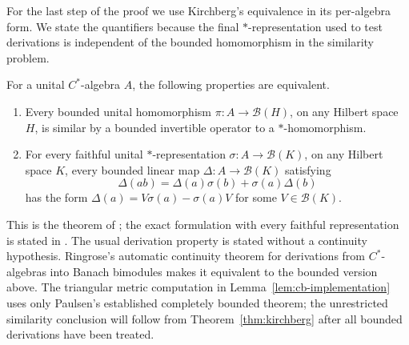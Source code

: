For the last step of the proof we use Kirchberg's equivalence in its
per-algebra form. We state the quantifiers because the final
\(*\)-representation used to test derivations is independent of the
bounded homomorphism in the similarity problem.

\begin{theorem}
\label{thm:kirchberg}
For a unital \(C^*\)-algebra \(A\), the following properties are
equivalent.
\begin{enumerate}
 \item Every bounded unital homomorphism
 \(\pi:A\to\mathcal B(H)\), on any Hilbert space \(H\), is similar
 by a bounded invertible operator to a \(*\)-homomorphism.
 \item For every faithful unital \(*\)-representation
 \(\sigma:A\to\mathcal B(K)\), on any Hilbert space \(K\), every
 bounded linear map \(\Delta:A\to\mathcal B(K)\) satisfying
 \[
  \Delta(ab)=\Delta(a)\sigma(b)+\sigma(a)\Delta(b)
 \]
 has the form \(\Delta(a)=V\sigma(a)-\sigma(a)V\) for some
 \(V\in\mathcal B(K)\).
\end{enumerate}
\end{theorem}

This is the theorem of \citet{Kirchberg1996}; the exact formulation
with every faithful representation is stated in
\citet[Theorem~1.1]{Ozawa2006}. The usual derivation property is stated
without a continuity hypothesis. Ringrose's automatic continuity
theorem for derivations from \(C^*\)-algebras into Banach bimodules
\citep[Theorem~2, p.~434]{Ringrose1972} makes it equivalent to the
bounded version above.
The triangular metric computation in
Lemma~\ref{lem:cb-implementation} uses only Paulsen's established
completely bounded theorem; the unrestricted similarity conclusion
will follow from Theorem~\ref{thm:kirchberg} after all bounded
derivations have been treated.
